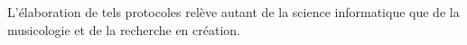 L'élaboration de tels protocoles relève autant de la science informatique que de la musicologie et de la recherche en création.















